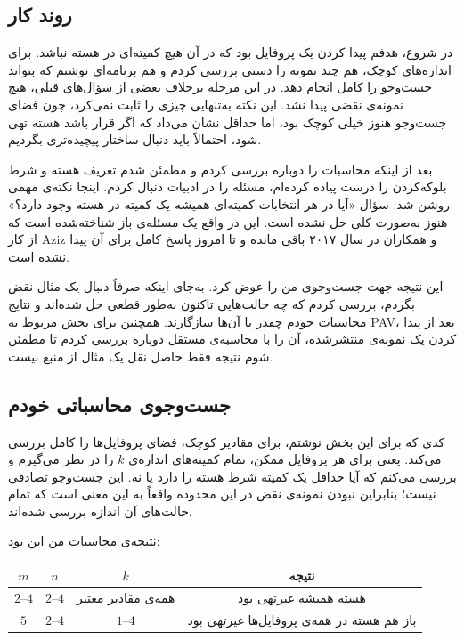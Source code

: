 \documentclass[12pt, a4paper]{article}
\begin{document}
\subsection{روند کار}

در شروع، هدفم پیدا کردن یک پروفایل بود که در آن هیچ کمیته‌ای در هسته نباشد. برای اندازه‌های کوچک، هم چند نمونه را دستی بررسی کردم و هم برنامه‌ای نوشتم که بتواند جست‌وجو را کامل انجام دهد. در این مرحله برخلاف بعضی از سؤال‌های قبلی، هیچ نمونه‌ی نقضی پیدا نشد. این نکته به‌تنهایی چیزی را ثابت نمی‌کرد، چون فضای جست‌وجو هنوز خیلی کوچک بود، اما حداقل نشان می‌داد که اگر قرار باشد هسته تهی شود، احتمالاً باید دنبال ساختار پیچیده‌تری بگردیم.

بعد از اینکه محاسبات را دوباره بررسی کردم و مطمئن شدم تعریف هسته و شرط بلوکه‌کردن را درست پیاده کرده‌ام، مسئله را در ادبیات دنبال کردم. اینجا نکته‌ی مهمی روشن شد: سؤال «آیا در هر انتخابات کمیته‌ای همیشه یک کمیته در هسته وجود دارد؟» هنوز به‌صورت کلی حل نشده است. این در واقع یک مسئله‌ی باز شناخته‌شده است که از کار Aziz و همکاران در سال ۲۰۱۷ باقی مانده و تا امروز پاسخ کامل برای آن پیدا نشده است. \cite{aziz2017core}

این نتیجه جهت جست‌وجوی من را عوض کرد. به‌جای اینکه صرفاً دنبال یک مثال نقض بگردم، بررسی کردم که چه حالت‌هایی تاکنون به‌طور قطعی حل شده‌اند و نتایج محاسبات خودم چقدر با آن‌ها سازگارند. همچنین برای بخش مربوط به PAV، بعد از پیدا کردن یک نمونه‌ی منتشرشده، آن را با محاسبه‌ی مستقل دوباره بررسی کردم تا مطمئن شوم نتیجه فقط حاصل نقل یک مثال از منبع نیست.

\subsection{جست‌وجوی محاسباتی خودم}

کدی که برای این بخش نوشتم، برای مقادیر کوچک، فضای پروفایل‌ها را کامل بررسی می‌کند. یعنی برای هر پروفایل ممکن، تمام کمیته‌های اندازه‌ی $k$ را در نظر می‌گیرم و بررسی می‌کنم که آیا حداقل یک کمیته شرط هسته را دارد یا نه. این جست‌وجو تصادفی نیست؛ بنابراین نبودن نمونه‌ی نقض در این محدوده واقعاً به این معنی است که تمام حالت‌های آن اندازه بررسی شده‌اند.

نتیجه‌ی محاسبات من این بود:

\begin{center}
\begin{tabular}{c|c|c|c}
$m$ & $n$ & $k$ & نتیجه \\
\hline
$2$--$4$ & $2$--$4$ & همه‌ی مقادیر معتبر & هسته همیشه غیرتهی بود \\
$5$ & $2$--$4$ & $1$--$4$ & باز هم هسته در همه‌ی پروفایل‌ها غیرتهی بود
\end{tabular}
\end{center}
\end{document}
